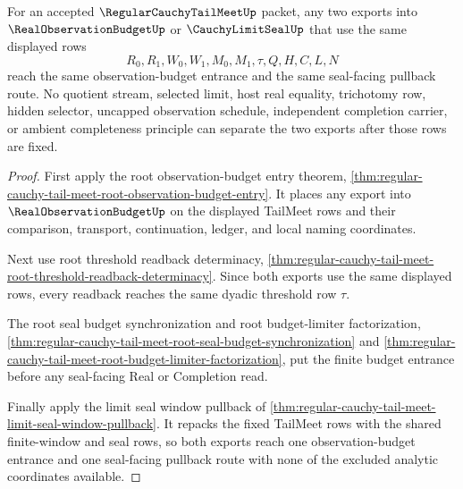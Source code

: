 \begin{theorem}
\label{thm:regular-cauchy-tail-meet-observation-budget-route-uniqueness}
For an accepted $\RegularCauchyTailMeetUp$ packet, any two exports into $\RealObservationBudgetUp$ or $\CauchyLimitSealUp$ that use the same displayed rows
$$
R_0,R_1,W_0,W_1,M_0,M_1,\tau,Q,H,C,L,N
$$
reach the same observation-budget entrance and the same seal-facing pullback route. No quotient stream, selected limit, host real equality, trichotomy row, hidden selector, uncapped observation schedule, independent completion carrier, or ambient completeness principle can separate the two exports after those rows are fixed.
\end{theorem}
\begin{proof}
First apply the root observation-budget entry theorem, \autoref{thm:regular-cauchy-tail-meet-root-observation-budget-entry}. It places any export into $\RealObservationBudgetUp$ on the displayed TailMeet rows and their comparison, transport, continuation, ledger, and local naming coordinates.

Next use root threshold readback determinacy, \autoref{thm:regular-cauchy-tail-meet-root-threshold-readback-determinacy}. Since both exports use the same displayed rows, every readback reaches the same dyadic threshold row $\tau$.

The root seal budget synchronization and root budget-limiter factorization, \autoref{thm:regular-cauchy-tail-meet-root-seal-budget-synchronization} and \autoref{thm:regular-cauchy-tail-meet-root-budget-limiter-factorization}, put the finite budget entrance before any seal-facing Real or Completion read.

Finally apply the limit seal window pullback of \autoref{thm:regular-cauchy-tail-meet-limit-seal-window-pullback}. It repacks the fixed TailMeet rows with the shared finite-window and seal rows, so both exports reach one observation-budget entrance and one seal-facing pullback route with none of the excluded analytic coordinates available.
\end{proof}

